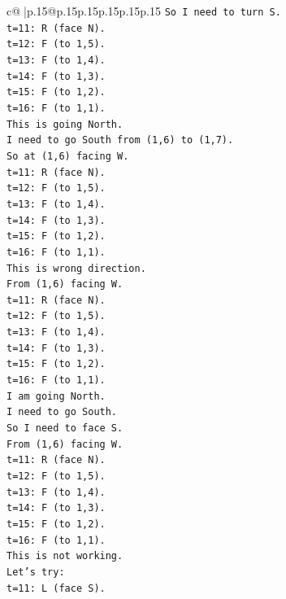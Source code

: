 \documentclass{article}
\begin{document}
{\begin{supertabular}{c@{$\;$}|p{.15\linewidth}@{}p{.15\linewidth}p{.15\linewidth}p{.15\linewidth}p{.15\linewidth}p{.15\linewidth}}
{{{\texttt{So I need to turn S.} \\
\texttt{t=11: R (face N).} \\
\texttt{t=12: F (to 1,5).} \\
\texttt{t=13: F (to 1,4).} \\
\texttt{t=14: F (to 1,3).} \\
\texttt{t=15: F (to 1,2).} \\
\texttt{t=16: F (to 1,1).} \\
\texttt{This is going North.} \\
\texttt{I need to go South from (1,6) to (1,7).} \\
\texttt{So at (1,6) facing W.} \\
\texttt{t=11: R (face N).} \\
\texttt{t=12: F (to 1,5).} \\
\texttt{t=13: F (to 1,4).} \\
\texttt{t=14: F (to 1,3).} \\
\texttt{t=15: F (to 1,2).} \\
\texttt{t=16: F (to 1,1).} \\
\texttt{This is wrong direction.} \\
\texttt{From (1,6) facing W.} \\
\texttt{t=11: R (face N).} \\
\texttt{t=12: F (to 1,5).} \\
\texttt{t=13: F (to 1,4).} \\
\texttt{t=14: F (to 1,3).} \\
\texttt{t=15: F (to 1,2).} \\
\texttt{t=16: F (to 1,1).} \\
\texttt{I am going North.} \\
\texttt{I need to go South.} \\
\texttt{So I need to face S.} \\
\texttt{From (1,6) facing W.} \\
\texttt{t=11: R (face N).} \\
\texttt{t=12: F (to 1,5).} \\
\texttt{t=13: F (to 1,4).} \\
\texttt{t=14: F (to 1,3).} \\
\texttt{t=15: F (to 1,2).} \\
\texttt{t=16: F (to 1,1).} \\
\texttt{This is not working.} \\
\texttt{Let's try:} \\
\texttt{t=11: L (face S).} \\
}}}
\end{supertabular}}
\end{document}
